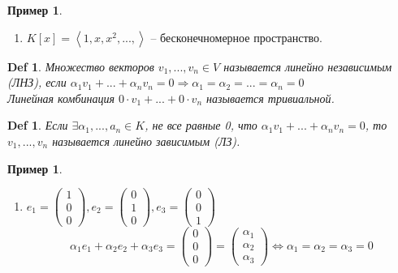 \documentclass[12pt]{article}
\newenvironment{MyList}[1][4pt]{
  \begin{enumerate}[1.]
  \setlength{\parskip}{0pt}
  \setlength{\itemsep}{#1}
}{       
  \end{enumerate}
}
\def\SO{\Rightarrow}     %
\def\EQ{\Leftrightarrow} %
\theoremstyle{definition} %
\newtheorem{Example}[Thm]{Пример} %
\theoremstyle{plain} %
\newtheorem{Def}[Thm]{Def} %
\theoremstyle{remark} %
\begin{document}
{\begin{Example}
\begin{MyList}
        \item $K[x] = \left\langle 1, x, x^2, ..., \right\rangle$ -- бесконечномерное пространство. 
    \end{MyList} 
\end{Example}

\begin{Def}
    Множество векторов $v_1, ..., v_n \in V$ называется линейно независимым (ЛНЗ), если $\alpha_1 v_1 + ... + \alpha_n v_n = 0 \SO \alpha_1 = \alpha_2 = ... = \alpha_n = 0$ \\
    Линейная комбинация $0 \cdot v_1 + ... + 0 \cdot v_n$ называется тривиальной.  
\end{Def}

\begin{Def}
    Если $\exists \alpha_1, ..., a_n \in K$, не все равные 0, что 
    $\alpha_1 v_1 + ... + \alpha_n v_n = 0$, то $v_1, ..., v_n$ называется линейно зависимым (ЛЗ).  
\end{Def}

\begin{Example}
    \begin{MyList}
        \item $e_1 = \begin{pmatrix}
        1 \\ 
        0 \\ 
        0
        \end{pmatrix}, e_2 = \begin{pmatrix}
        0 \\ 
        1 \\ 
        0
        \end{pmatrix}, e_3 = \begin{pmatrix}
        0 \\ 
        0 \\ 
        1
        \end{pmatrix}$ 
        \[\alpha_1 e_1 + \alpha_2 e_2 + \alpha_3 e_3 = \begin{pmatrix}
        0 \\ 
        0 \\ 
        0
        \end{pmatrix} = \begin{pmatrix}
        \alpha_1 \\ 
        \alpha_2  \\ 
        \alpha_3 
        \end{pmatrix} \EQ \alpha_1 = \alpha_2 = \alpha_3 = 0\]
        

\end{MyList}
\end{Example}}
\end{document}
